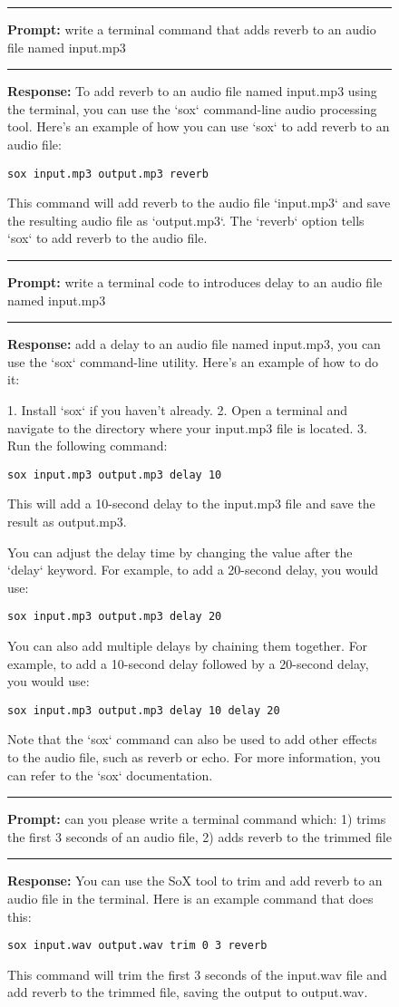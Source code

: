 \documentclass[10pt]{article}
\begin{document}
\begin{figure}
\small
\noindent\rule{\textwidth}{1pt}
\textbf{Prompt: } write a terminal command that adds reverb to an audio file named input.mp3
\\
\noindent\rule{\textwidth}{1pt}
\textbf{Response: }
To add reverb to an audio file named input.mp3 using the terminal, you can use the `sox` command-line audio processing tool. Here's an example of how you can use `sox` to add reverb to an audio file:
\begin{verbatim}
sox input.mp3 output.mp3 reverb
\end{verbatim}
This command will add reverb to the audio file `input.mp3` and save the resulting audio file as `output.mp3`. The `reverb` option tells `sox` to add reverb to the audio file.\\
\noindent\rule{\textwidth}{1pt}
\textbf{Prompt: } write a terminal code to introduces delay to an audio file named input.mp3\\
\noindent\rule{\textwidth}{1pt}
\textbf{Response: }  add a delay to an audio file named input.mp3, you can use the `sox` command-line utility. Here's an example of how to do it:

1. Install `sox` if you haven't already.
2. Open a terminal and navigate to the directory where your input.mp3 file is located.
3. Run the following command:
\begin{verbatim}
sox input.mp3 output.mp3 delay 10
\end{verbatim}
This will add a 10-second delay to the input.mp3 file and save the result as output.mp3.

You can adjust the delay time by changing the value after the `delay` keyword. For example, to add a 20-second delay, you would use:
\begin{verbatim}
sox input.mp3 output.mp3 delay 20
\end{verbatim}
You can also add multiple delays by chaining them together. For example, to add a 10-second delay followed by a 20-second delay, you would use:
\begin{verbatim}
sox input.mp3 output.mp3 delay 10 delay 20
\end{verbatim}
Note that the `sox` command can also be used to add other effects to the audio file, such as reverb or echo. For more information, you can refer to the `sox` documentation.\\
\noindent\rule{\textwidth}{1pt}
\textbf{Prompt: } can you please write a terminal command which: 1) trims the first 3 seconds of an audio file, 2) adds reverb to the trimmed file\\
\noindent\rule{\textwidth}{1pt}
\textbf{Response: }
You can use the SoX tool to trim and add reverb to an audio file in the terminal. Here is an example command that does this:
\begin{verbatim}
sox input.wav output.wav trim 0 3 reverb
\end{verbatim}
This command will trim the first 3 seconds of the input.wav file and add reverb to the trimmed file, saving the output to output.wav.


\end{figure}
\end{document}
